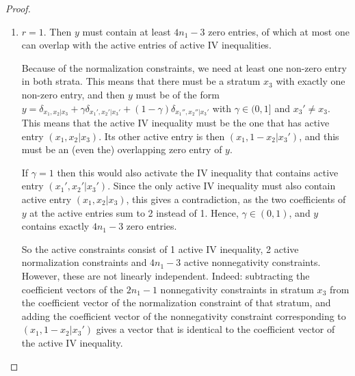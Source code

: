 \begin{proof}
\begin{enumerate}
\begin{enumerate}
          This implies $2n_1-1$ zeroes in the stratum of $j$. %
          Consider now the other active IV inequality. 
          Since $y_j=1$, the active entry corresponding to that stratum must be a zero entry of $y$. 
          Hence, $y_k=1$ for $k$ the other active entry in this IV inequality.
          This means that $y$ must be of the form $\delta_{x_1,x_2|0} + \delta_{x_1',x_2'|1}$, with the two non-zero entries corresponding to active entries of two different IV inequalities, and hence we recover the extreme points already identified.
      \end{enumerate}
    \item $r = 1$.
      Then $y$ must contain at least $4n_1-3$ zero entries, of which at most one can overlap with  the active entries of active IV inequalities.

      Because of the normalization constraints, we need at least one non-zero entry in both strata.
      This means that there must be a stratum $x_3$ with exactly one non-zero entry, and then $y$ must be of the form
      $y = \delta_{x_1,x_2|x_3} + \gamma \delta_{x_1',x_2'|x_3'} + (1-\gamma) \delta_{x_1'',x_2''|x_3'}$ with $\gamma \in (0,1]$ and $x_3' \ne x_3$.
      This means that the active IV inequality must be the one that has active entry $(x_1,x_2|x_3)$.
      Its other active entry is then $(x_1,1-x_2|x_3')$, and this must be an (even the) overlapping zero entry of $y$.

      If $\gamma = 1$ then this would also activate the IV inequality that contains active entry $(x_1',x_2'|x_3')$.
      Since the only active IV inequality must also contain active entry $(x_1,x_2|x_3)$, this gives a contradiction, as the two coefficients of $y$ at the active entries sum to 2 instead of 1.
      Hence, $\gamma \in (0,1)$, and $y$ contains exactly $4n_1-3$ zero entries.

      So the active constraints consist of 1 active IV inequality, 2 active normalization constraints and $4n_1-3$ active nonnegativity constraints.
      However, these are not linearly independent.
      Indeed: subtracting the coefficient vectors of the $2n_1-1$ nonnegativity constraints in stratum $x_3$ from the coefficient vector of the normalization constraint of that stratum, and adding the coefficient vector of the nonnegativity constraint corresponding to $(x_1,1-x_2|x_3')$ gives a vector that is identical to the coefficient vector of the active IV inequality.


\end{enumerate}
\end{proof}
